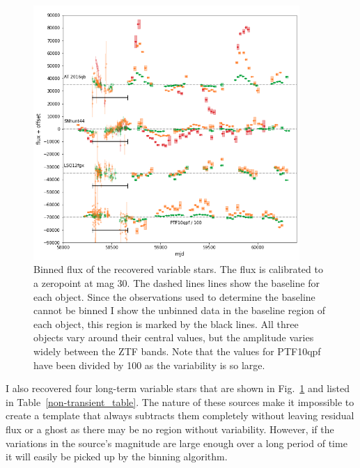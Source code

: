 \documentclass[a4paper,oneside,12pt, class=Latex/Classes/PhDthesisPSnPDF, crop=false]{standalone}
\begin{document}
\begin{figure}[h!]
    \centering
    \includegraphics[width=0.9\textwidth]{../Images/chapter_4/non-transients_varstar.png}
    \caption{Binned flux of the recovered variable stars. The flux is calibrated to a zeropoint at mag 30. The dashed lines lines show the baseline for each object. Since the observations used to determine the baseline cannot be binned I show the unbinned data in the baseline region of each object, this region is marked by the black lines. All three objects vary around their central values, but the amplitude varies widely between the ZTF bands. Note that the values for PTF10qpf have been divided by 100 as the variability is so large.}
    \label{non-transients_varstar}
\end{figure}

I also recovered four long-term variable stars that are shown in Fig.~\ref{non-transients_varstar} and listed in Table~\ref{non-transient_table}. The nature of these sources make it impossible to create a template that always subtracts them completely without leaving residual flux or a ghost as there may be no region without variability. However, if the variations in the source's magnitude are large enough over a long period of time it will easily be picked up by the binning algorithm.
\end{document}
